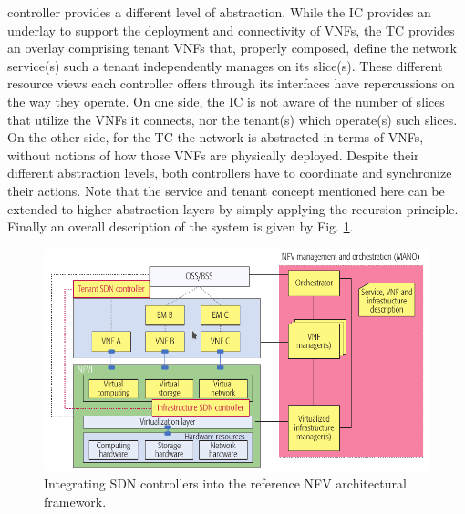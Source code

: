 \documentclass{article}
\begin{document}
controller provides a different level of abstraction. While the IC provides an underlay to support
the deployment and connectivity of VNFs, the
TC provides an overlay comprising tenant VNFs
that, properly composed, define the network service(s) such a tenant independently manages on
its slice(s). These different resource views each
controller offers through its interfaces have repercussions on the way they operate. On one side,
the IC is not aware of the number of slices that utilize the VNFs it connects, nor the tenant(s) which
operate(s) such slices. On the other side, for the
TC the network is abstracted in terms of VNFs,
without notions of how those VNFs are physically
deployed. Despite their different abstraction levels,
both controllers have to coordinate and synchronize their actions. Note that the service and
tenant concept mentioned here can be extended
to higher abstraction layers by simply applying the
recursion principle.
Finally an overall description of the system is given by Fig. \ref{integral}.
\begin{figure}[h]
\centering
\includegraphics[scale=0.56]{pics/integral.png} 
\caption{Integrating SDN controllers into the reference NFV architectural framework.}
\label{integral}
\end{figure}



\newpage
\end{document}
